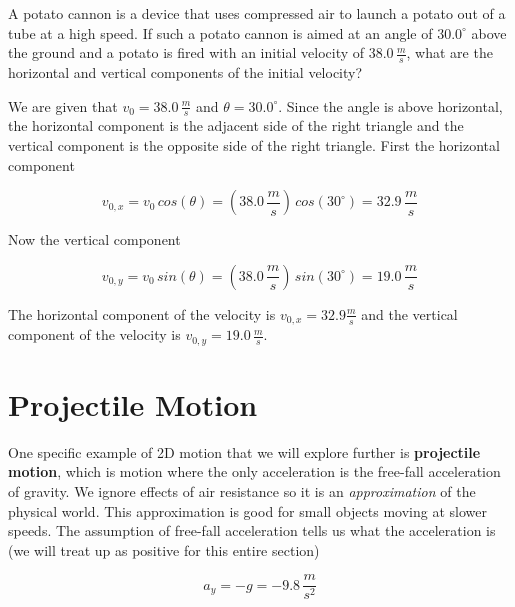 \documentclass[12pt]{book}
\begin{document}
\pagebreak

\begin{exampleblock}

A potato cannon is a device that uses compressed air to launch a potato out of a tube at a high speed. If such a potato cannon is aimed at an angle of $30.0^{\circ}$ above the ground and a potato is fired with an initial velocity of $38.0 \, \frac{m}{s}$, what are the horizontal and vertical components of the initial velocity?

\hspace{10pt}

We are given that $v_0 = 38.0 \, \frac{m}{s}$ and $\theta = 30.0^{\circ}$. Since the angle is above horizontal, the horizontal component is the adjacent side of the right triangle and the vertical component is the opposite side of the right triangle. First the horizontal component

\begin{equation}
v_{0,x} = v_0 \, cos(\theta) = (38.0 \, \frac{m}{s}) \, cos(30^{\circ}) = 32.9 \, \frac{m}{s}
\end{equation}

Now the vertical component

\begin{equation}
v_{0,y} = v_0 \, sin(\theta) = (38.0 \, \frac{m}{s}) \, sin(30^{\circ}) = 19.0 \, \frac{m}{s}
\end{equation}

The horizontal component of the velocity is $v_{0,x} = 32.9 \frac{m}{s}$ and the vertical component of the velocity is $v_{0,y} = 19.0 \, \frac{m}{s}$.

\end{exampleblock}

\section{Projectile Motion}

One specific example of 2D motion that we will explore further is \textbf{projectile motion}, which is motion where the only acceleration is the free-fall acceleration of gravity. We ignore effects of air resistance so it is an \textit{approximation} of the physical world. This approximation is good for small objects moving at slower speeds. The assumption of free-fall acceleration tells us what the acceleration is (we will treat up as positive for this entire section)

\begin{equation}
a_y = -g = -9.8 \, \frac{m}{s^2}
\end{equation}
\end{document}
